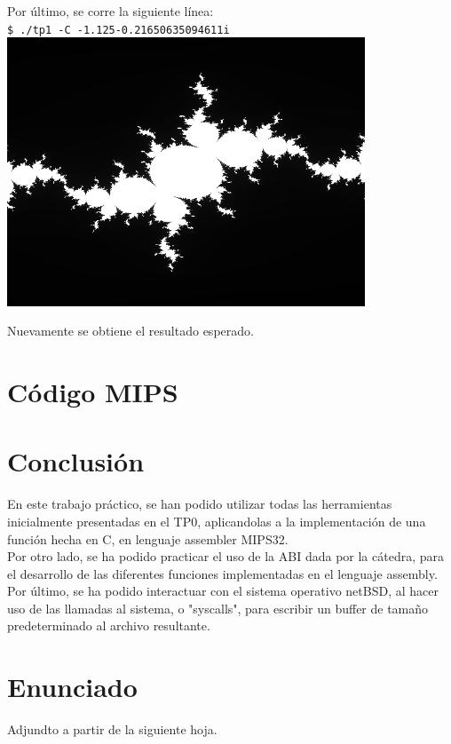 Por último, se corre la siguiente línea:\\
\texttt{\$  ./tp1 -C -1.125-0.21650635094611i}\\
\includegraphics[width=0.8\textwidth,natwidth=610,natheight=642]{imgs/output3.png}

\bigskip

Nuevamente se obtiene el resultado esperado.

\section{Código MIPS}


\bigskip



\section{Conclusión}
	En este trabajo práctico, se han podido utilizar todas las herramientas inicialmente presentadas en el TP0, aplicandolas a la implementación de una función hecha en C, en lenguaje assembler MIPS32.\\
	Por otro lado, se ha podido practicar el uso de la ABI dada por la cátedra, para el desarrollo de las diferentes funciones implementadas en el lenguaje assembly.\\
	Por último, se ha podido interactuar con el sistema operativo netBSD, al hacer uso de las llamadas al sistema, o "syscalls", para escribir un buffer de tamaño predeterminado al archivo resultante.

\section{Enunciado}

Adjundto a partir de la siguiente hoja.




